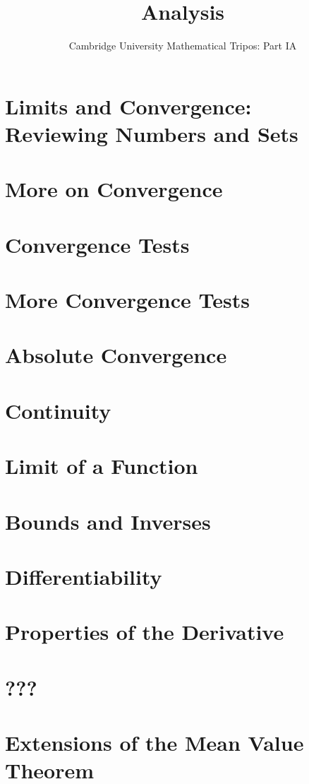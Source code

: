 \documentclass{article}
\title{Analysis}
\author{Cambridge University Mathematical Tripos: Part IA}
\begin{document}
\maketitle

\tableofcontentsnewpage

\section{Limits and Convergence: Reviewing Numbers and Sets}

\section{More on Convergence}

\section{Convergence Tests}

\section{More Convergence Tests}

\section{Absolute Convergence}

\section{Continuity}

\section{Limit of a Function}

\section{Bounds and Inverses}

\section{Differentiability}

\section{Properties of the Derivative}

\section{???}

\section{Extensions of the Mean Value Theorem}

\end{document}
